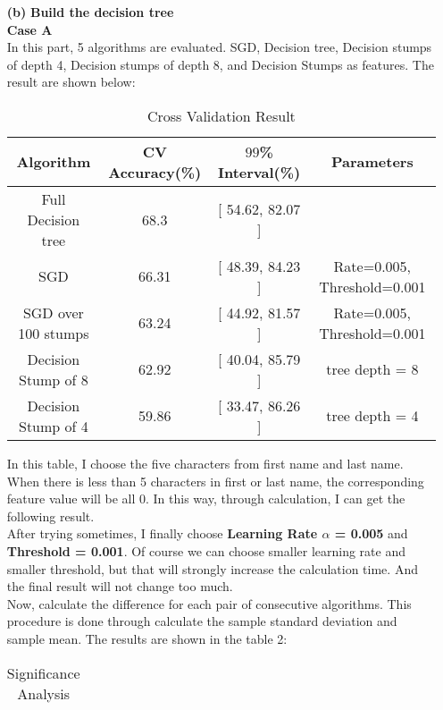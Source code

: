 \begin{enumerate}
\begin{enumerate}
\item[{\bf (b)}] {\bf Build the decision tree}\\

{\bf Case A}\\

In this part, 5 algorithms are evaluated. SGD, Decision tree, Decision stumps of depth 4, Decision stumps of depth 8, and Decision Stumps as features. The result are shown below:\\

\begin{table}[H]
\caption {Cross Validation Result}
\centering
\begin{tabular}{|c|c|c|c|}

\hline
{\bf Algorithm} & {\bf CV Accuracy(\%)} & {\bf $99$\% Interval(\%)} & {\bf Parameters} \\
\hline
Full Decision tree & 68.3 & [ 54.62, 82.07 ] & {} \\
\hline
SGD & 66.31 & [ 48.39, 84.23 ]  & {Rate=0.005, Threshold=0.001} \\
\hline
SGD over 100 stumps & 63.24 & [ 44.92, 81.57 ]  & Rate=0.005, Threshold=0.001 \\
\hline
Decision Stump of 8 & 62.92 & [ 40.04, 85.79 ]  & tree depth = 8 \\
\hline
Decision Stump of 4 & 59.86 & [ 33.47, 86.26 ]  & tree depth = 4  \\
\hline
\end{tabular}
\end{table}

In this table, I choose the five characters from first name and last name. When there is less than 5 characters in first or last name, the corresponding feature value will be all 0. In this way, through calculation, I can get the following result.\\

After trying sometimes, I finally choose {\bf Learning Rate $\alpha$ = 0.005} and {\bf Threshold = 0.001}. Of course we can choose smaller learning rate and smaller threshold, but that will strongly increase the calculation time. And the final result will not change too much.\\

Now, calculate the difference for each pair of consecutive algorithms. This procedure is done through calculate the sample standard deviation and sample mean. The results are shown in the table 2:\\

\begin{table}[H]
\caption {Significance Analysis}
\centering
\begin{tabular}{|c|c|c|c|}


\end{tabular}
\end{table}
\end{enumerate}
\end{enumerate}

